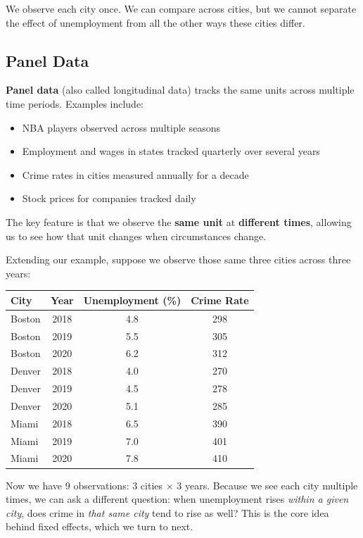 \documentclass[
  letterpaper,
  DIV=11,
  numbers=noendperiod]{scrreprt}
\newcounter{none} %
\providecommand{\tightlist}{%
  \setlength{\itemsep}{0pt}\setlength{\parskip}{0pt}}
\begin{document}
We observe each city once. We can compare across cities, but we cannot
separate the effect of unemployment from all the other ways these cities
differ.

\subsection{Panel Data}\label{panel-data}

\textbf{Panel data} (also called longitudinal data) tracks the same
units across multiple time periods. Examples include:

\begin{itemize}
\tightlist
\item
  NBA players observed across multiple seasons
\item
  Employment and wages in states tracked quarterly over several years
\item
  Crime rates in cities measured annually for a decade
\item
  Stock prices for companies tracked daily
\end{itemize}

The key feature is that we observe the \textbf{same unit} at
\textbf{different times}, allowing us to see how that unit changes when
circumstances change.

Extending our example, suppose we observe those same three cities across
three years:

{\def\LTcaptype{none} %
\begin{longtable}[]{@{}lccc@{}}
\toprule\noalign{}
City & Year & Unemployment (\%) & Crime Rate \\
\midrule\noalign{}
\endhead
\bottomrule\noalign{}
\endlastfoot
Boston & 2018 & 4.8 & 298 \\
Boston & 2019 & 5.5 & 305 \\
Boston & 2020 & 6.2 & 312 \\
Denver & 2018 & 4.0 & 270 \\
Denver & 2019 & 4.5 & 278 \\
Denver & 2020 & 5.1 & 285 \\
Miami & 2018 & 6.5 & 390 \\
Miami & 2019 & 7.0 & 401 \\
Miami & 2020 & 7.8 & 410 \\
\end{longtable}
}

Now we have 9 observations: 3 cities \(\times\) 3 years. Because we see
each city multiple times, we can ask a different question: when
unemployment rises \emph{within a given city}, does crime in \emph{that
same city} tend to rise as well? This is the core idea behind fixed
effects, which we turn to next.
\end{document}
